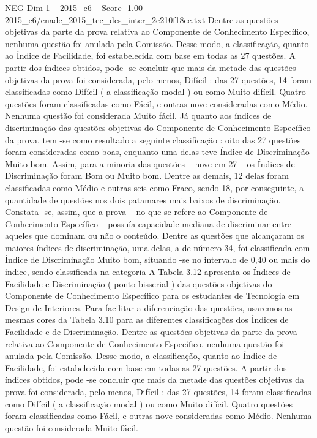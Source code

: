 \begin{textsample}{NEG Dim 1 – 2015\_c6 – Score -1.00 – 2015\_c6/enade\_2015\_tec\_des\_inter\_2e210f18ec.txt}
Dentre as questões objetivas da parte da prova relativa ao Componente de Conhecimento Específico, nenhuma questão foi anulada pela Comissão.
Desse modo, a classificação, quanto ao Índice de Facilidade, foi estabelecida com base em todas as 27 questões.
A partir dos índices obtidos, pode -se concluir que mais da metade das questões objetivas da prova foi considerada, pelo menos, Difícil : das 27 questões, 14 foram classificadas como Difícil ( a classificação modal ) ou como Muito difícil.
Quatro questões foram classificadas como Fácil, e outras nove consideradas como Médio.
Nenhuma questão foi considerada Muito fácil.
Já quanto aos índices de discriminação das questões objetivas do Componente de Conhecimento Específico da prova, tem -se como resultado a seguinte classificação : oito das 27 questões foram consideradas como boas, enquanto uma delas teve Índice de Discriminação Muito bom.
Assim, para a minoria das questões – nove em 27 – os Índices de Discriminação foram Bom ou Muito bom.
Dentre as demais, 12 delas foram classificadas como Médio e outras seis como Fraco, sendo 18, por conseguinte, a quantidade de questões nos dois patamares mais baixos de discriminação.
Constata -se, assim, que a prova – no que se refere ao Componente de Conhecimento Específico – possuía capacidade mediana de discriminar entre aqueles que dominam ou não o conteúdo.
Dentre as questões que alcançaram os maiores índices de discriminação, uma delas, a de número 34, foi classificada com Índice de Discriminação Muito bom, situando -se no intervalo de 0,40 ou mais do índice, sendo classificada na categoria A Tabela 3.12 apresenta os Índices de Facilidade e Discriminação ( ponto bisserial ) das questões objetivas do Componente de Conhecimento Específico para os estudantes de Tecnologia em Design de Interiores.
Para facilitar a diferenciação das questões, usaremos as mesmas cores da Tabela 3.10 para as diferentes classificações dos Índices de Facilidade e de Discriminação.
Dentre as questões objetivas da parte da prova relativa ao Componente de Conhecimento Específico, nenhuma questão foi anulada pela Comissão.
Desse modo, a classificação, quanto ao Índice de Facilidade, foi estabelecida com base em todas as 27 questões.
A partir dos índices obtidos, pode -se concluir que mais da metade das questões objetivas da prova foi considerada, pelo menos, Difícil : das 27 questões, 14 foram classificadas como Difícil ( a classificação modal ) ou como Muito difícil.
Quatro questões foram classificadas como Fácil, e outras nove consideradas como Médio.
Nenhuma questão foi considerada Muito fácil.

\end{textsample}
